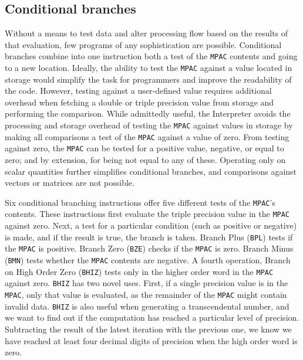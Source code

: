 \documentclass[refcap, oxford]{ahsan}
\begin{document}
\subsection{Conditional branches}
Without a means to test data and alter processing flow based on the results of that evaluation, few programs of any sophistication are possible. Conditional branches combine into one instruction both a test of the \texttt{MPAC} contents and going to a new location. Ideally, the ability to test the \texttt{MPAC} against a value located in storage would simplify the task for programmers and improve the readability of the code. However, testing against a user-defined value requires additional overhead when fetching a double or triple precision value from storage and performing the comparison. While admittedly useful, the Interpreter avoids the processing and storage overhead of testing the \texttt{MPAC} against values in storage by making all comparisons a test of the \texttt{MPAC} against a value of zero. From testing against zero, the \texttt{MPAC} can be tested for a positive value, negative, or equal to zero; and by extension, for being not equal to any of these. Operating only on scalar quantities further simplifies conditional branches, and comparisons against vectors or matrices are not possible.

Six conditional branching instructions offer five different tests of the \texttt{MPAC}'s contents. These instructions first evaluate the triple precision value in the \texttt{MPAC} against zero. Next, a test for a particular condition (such as positive or negative) is made, and if the result is true, the branch is taken. Branch Plus (\texttt{BPL}) tests if the \texttt{MPAC} is positive. Branch Zero (\texttt{BZE}) checks if the \texttt{MPAC} is zero. Branch Minus (\texttt{BMN}) tests whether the \texttt{MPAC} contents are negative. A fourth operation, Branch on High Order Zero (\texttt{BHIZ}) tests only in the higher order word in the \texttt{MPAC} against zero. \texttt{BHIZ} has two novel uses. First, if a single precision value is in the \texttt{MPAC}, only that value is evaluated, as the remainder of the \texttt{MPAC} might contain invalid data. \texttt{BHIZ} is also useful when generating a transcendental number, and we want to find out if the computation has reached a particular level of precision. Subtracting the result of the latest iteration with the previous one, we know we have reached at least four decimal digits of precision when the high order word is zero.
\end{document}
